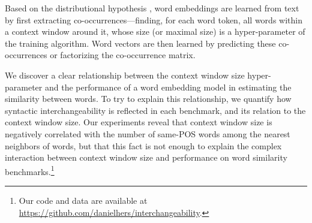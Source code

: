\documentclass[11pt,a4paper]{article}
\begin{document}
    Based on the distributional hypothesis \cite{harris1954distributional},
    word embeddings are learned from text
    by first extracting co-occurrences---finding, for each word token, all
    words within a context window around it,
    whose size (or maximal size) is a hyper-parameter of the training algorithm.
    Word vectors are then learned by predicting these co-occurrences or
    factorizing the co-occurrence matrix.

    We discover a clear relationship between the context window size hyper-parameter
    and the performance of a word embedding model in estimating the similarity between words.
    To try to explain this relationship, we quantify how syntactic interchangeability
    is reflected in each benchmark,
    and its relation to the context window size.
    Our experiments reveal that context window size is negatively correlated
    with the number of same-POS words among the nearest neighbors of words,
    but that this fact is not enough to explain the complex interaction between
    context window size and performance on word similarity
    benchmarks.\footnote{Our code and data are available at \url{https://github.com/danielhers/interchangeability}.}
    
\end{document}
